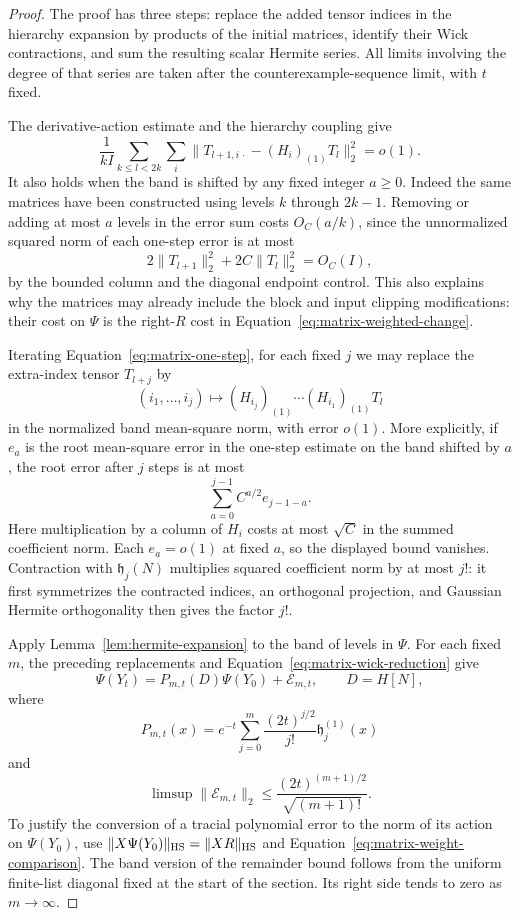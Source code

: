 \begin{proof}
The proof has three steps: replace the added tensor indices in the
hierarchy expansion by products of the initial matrices, identify their
Wick contractions, and sum the resulting scalar Hermite series.
All limits involving the degree of that series are taken after the
counterexample-sequence limit, with $t$ fixed.

The derivative-action estimate and the hierarchy coupling give
\begin{equation}\label{eq:matrix-one-step}
 \frac1{kI}\sum_{k\le l<2k}\sum_i
 \|T_{l+1,i\,\cdot}-(H_i)_{(1)}T_l\|_2^2=o(1).
\end{equation}
It also holds when the band is shifted by any fixed integer $a\ge0$.
Indeed the same matrices have been constructed using levels $k$ through
$2k-1$.  Removing or adding at most $a$ levels in the error sum costs
$O_C(a/k)$, since the unnormalized squared norm of each one-step
error is at most
\[
 2\|T_{l+1}\|_2^2+2C\|T_l\|_2^2=O_C(I),
\]
by the bounded column and the diagonal endpoint control.  This also
explains why the matrices may already include the block and input
clipping modifications: their cost on $\Psi$ is the right-$R$ cost in
Equation~\eqref{eq:matrix-weighted-change}.

Iterating Equation~\eqref{eq:matrix-one-step}, for each fixed $j$ we may
replace the extra-index tensor $T_{l+j}$ by
\[
 (i_1,\ldots,i_j)\longmapsto
 (H_{i_j})_{(1)}\cdots(H_{i_1})_{(1)}T_l
\]
in the normalized band mean-square norm, with error $o(1)$.
More explicitly, if $e_a$ is the root mean-square error in the one-step
estimate on the band shifted by $a$, the root error after $j$ steps is at
most
\[
 \sum_{a=0}^{j-1}C^{a/2}e_{j-1-a}.
\]
Here multiplication by a column of $H_i$ costs at most $\sqrt C$ in the
summed coefficient norm.  Each $e_a=o(1)$ at fixed $a$, so the displayed
bound vanishes.  Contraction with $\mathfrak h_j(N)$ multiplies squared
coefficient norm by at most $j!$: it first symmetrizes the contracted
indices, an orthogonal projection, and Gaussian Hermite orthogonality
then gives the factor $j!$.

Apply Lemma~\ref{lem:hermite-expansion} to the band of levels in $\Psi$.
For each fixed $m$, the preceding replacements and
Equation~\eqref{eq:matrix-wick-reduction} give
\[
 \Psi(Y_t)=P_{m,t}(D)\Psi(Y_0)+\mathcal E_{m,t},\qquad D=H[N],
\]
where
\[
 P_{m,t}(x)=e^{-t}\sum_{j=0}^m
          \frac{(2t)^{j/2}}{j!}\mathfrak h_j^{(1)}(x)
\]
and
\begin{equation}\label{eq:matrix-hermite-error}
 \limsup\|\mathcal E_{m,t}\|_2
 \le \frac{(2t)^{(m+1)/2}}{\sqrt{(m+1)!}}.
\end{equation}
To justify the conversion of a tracial polynomial error to the norm of
its action on $\Psi(Y_0)$, use
$\|X\Psi(Y_0)\|_{\mathrm{HS}}=\|XR\|_{\mathrm{HS}}$ and
Equation~\eqref{eq:matrix-weight-comparison}.  The band version of the
remainder bound follows from the uniform finite-list diagonal fixed at
the start of the section.  Its right side tends to zero as $m\to\infty$.


\end{proof}

